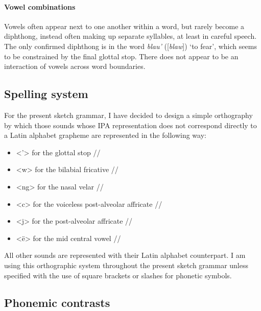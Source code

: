 \documentclass[../hewa_main-subfiles.tex]{subfiles}
\begin{document}

\paragraph{Vowel combinations}

Vowels often appear next to one another within a word, but rarely become a diphthong, instead often making up separate syllables, at least in careful speech. The only confirmed diphthong is in the word \textit{blau'} ([\textit{blaw\textglotstop}]) `to fear', which seems to be constrained by the final glottal stop. There does not appear to be an interaction of vowels across word boundaries.

\subsection{Spelling system}\label{sec:spel}

For the present sketch grammar, I have decided to design a simple orthography by which those sounds whose IPA representation does not correspond directly to a Latin alphabet grapheme are represented in the following way:

\begin{itemize}

\item <'> for the glottal stop /\textglotstop /
\item <w> for the bilabial fricative /\textbeta /
\item <ng> for the nasal velar //
\item <c> for the voiceless post-alveolar affricate //
\item <j> for the post-alveolar affricate //
\item <ë> for the mid central vowel /\textschwa /

\end{itemize}

All other sounds are represented with their Latin alphabet counterpart. I am using this orthographic system throughout the present sketch grammar unless specified with the use of square brackets or slashes for phonetic symbols.

\subsection{Phonemic contrasts}\label{sec:contr}
\end{document}
